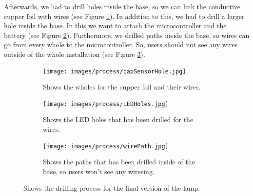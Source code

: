 \documentclass[00_doc.tex]{subfiles}
\begin{document}
    \noindent
    Afterwards, we had to drill holes inside the base, so we can link the conductive cupper foil 
    with wires (see Figure \ref{fig:capSensorHole}). In addition to this, we had to 
    drill a larger hole inside the base. In this we want to attach the microcontroller and the 
    battery (see Figure \ref{fig:LEDHoles}). Furthermore, we drilled paths inside the 
    base, so wires can go from every whole to the microcontroller. So, users should not see 
    any wires outside of the whole installation (see Figure \ref{fig:wirePath}).

    \begin{figure}[H]
        \centering
        \begin{subfigure}{.45\textwidth}
        \centering
        \texttt{[image: images/process/capSensorHole.jpg]}
        \caption{Shows the wholes for the cupper foil and their wires.}
        \label{fig:capSensorHole}
        \vspace{6mm}
        \end{subfigure}
        \medskip
        \hspace{1mm}
        \begin{subfigure}{.45\textwidth}
            \centering
            \texttt{[image: images/process/LEDHoles.jpg]}
            \caption{Shows the LED holes that has been drilled for the wires.}
            \label{fig:LEDHoles}
            \vspace{6mm}
        \end{subfigure}
        \hspace{1mm}
        \begin{subfigure}{.45\textwidth}
            \centering
            \texttt{[image: images/process/wirePath.jpg]}
            \caption{Shows the paths that has been drilled inside of the base, so 
            users won't see any wiresing.}
            \label{fig:wirePath}
            \vspace{6mm}
        \end{subfigure}
        \caption{Shows the drilling process for the final version of the lamp.}
        \label{fig:drillingProcess}
    \end{figure}
\end{document}
